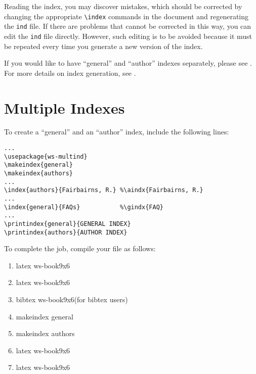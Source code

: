 Reading the index, you may discover mistakes, which
should be corrected by changing the appropriate \verb|\index|
commands in the document and regenerating the {\tt ind} file.  If
there are problems that cannot be corrected in this way, you can
edit the {\tt ind} file directly.  However, such editing is
to be avoided because it must be repeated every time you generate a
new version of the index.

If you would like to have ``general'' and ``author'' indexes
separately, please see . For more details on index
generation, see \cite{lamp87}.

\section{Multiple Indexes}\label{sec3.1}

To create a ``general'' and an ``author'' index, include the following lines:

\begin{verbatim}
...
\usepackage{ws-multind}
\makeindex{general}
\makeindex{authors}
...
\index{authors}{Fairbairns, R.} %\aindx{Fairbairns, R.}
...
\index{general}{FAQs}           %\gindx{FAQ}
...
\printindex{general}{GENERAL INDEX}
\printindex{authors}{AUTHOR INDEX}
\end{verbatim}

To complete the job, compile your file as follows:

\begin{enumerate}
\item latex ws-book9x6
\item latex ws-book9x6
\item bibtex ws-book9x6\qquad(for bibtex users)
\item makeindex general
\item makeindex authors
\item latex ws-book9x6
\item latex ws-book9x6
\end{enumerate}
